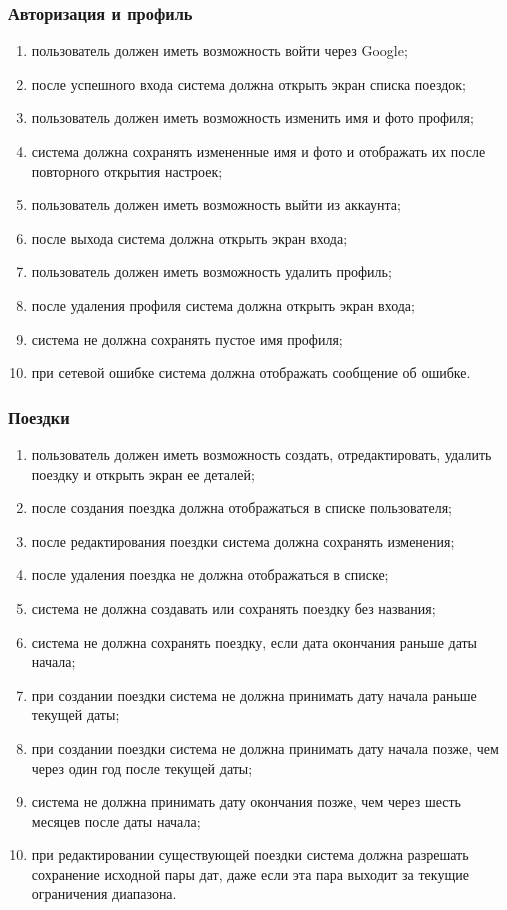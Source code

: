 \documentclass[12pt,a4paper]{article}
\begin{document}
\subsubsection{Авторизация и профиль}
\begin{enumerate}
  \item пользователь должен иметь возможность войти через Google;
  \item после успешного входа система должна открыть экран списка поездок;
  \item пользователь должен иметь возможность изменить имя и фото профиля;
  \item система должна сохранять измененные имя и фото и отображать их после повторного открытия настроек;
  \item пользователь должен иметь возможность выйти из аккаунта;
  \item после выхода система должна открыть экран входа;
  \item пользователь должен иметь возможность удалить профиль;
  \item после удаления профиля система должна открыть экран входа;
  \item система не должна сохранять пустое имя профиля;
  \item при сетевой ошибке система должна отображать сообщение об ошибке.
\end{enumerate}

\subsubsection{Поездки}
\begin{enumerate}
  \item пользователь должен иметь возможность создать, отредактировать, удалить поездку и открыть экран ее деталей;
  \item после создания поездка должна отображаться в списке пользователя;
  \item после редактирования поездки система должна сохранять изменения;
  \item после удаления поездка не должна отображаться в списке;
  \item система не должна создавать или сохранять поездку без названия;
  \item система не должна сохранять поездку, если дата окончания раньше даты начала;
  \item при создании поездки система не должна принимать дату начала раньше текущей даты;
  \item при создании поездки система не должна принимать дату начала позже, чем через один год после текущей даты;
  \item система не должна принимать дату окончания позже, чем через шесть месяцев после даты начала;
  \item при редактировании существующей поездки система должна разрешать сохранение исходной пары дат, даже если эта пара выходит за текущие ограничения диапазона.
\end{enumerate}
\end{document}
